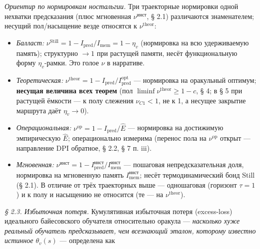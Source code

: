 \documentclass[12pt]{iopart}
\providecommand{\tightlist}{\setlength{\itemsep}{0pt}\setlength{\parskip}{0pt}}
\begin{document}
\emph{Ориентир по нормировкам ностальгии.} Три траекторные нормировки одной нехватки предсказания (плюс мгновенная \(\nu^{\text{инст}}\), § 2.1) различаются знаменателем; несущий пол/насыщение везде относятся к \(\nu^{\text{theor}}\):



\begin{itemize}

\tightlist

\item

  \emph{Балласт:} \(\nu^{\text{Still}} = 1 - I_{\text{pred}}/I_{\text{mem}} = 1 - \eta_v\) (нормировка на всю удерживаемую память); структурно \(\to 1\) при растущей памяти, несёт функциональную форму \(\eta_v\)-рамки. Это голое \(\nu\) в нарративе.

\item

  \emph{Теоретическая:} \(\nu^{\text{theor}} = 1 - I_{\text{pred}}/I_{\text{pred}}^{\text{opt}}\) --- нормировка на оракульный оптимум; \textbf{несущая величина всех теорем} (пол \(\liminf\nu^{\text{theor}} \ge 1-c\), § 4; в § 5 при растущей ёмкости --- к полу слежения \(\nu_{C1} < 1\), не к 1, а несущее закрытие маршрута даёт \(\eta_v \to 0\)).

\item

  \emph{Операциональная:} \(\nu^{\text{op}} = 1 - I_{\text{pred}}/\hat E\) --- нормировка на достижимую эмпирическую \(\hat E\); операционально измерима (перенос пола на \(\nu^{\text{op}}\) открыт --- направление DPI обратное, § 2.2, § 7 п. iii).

\item

  \emph{Мгновенная:} \(\nu^{\text{инст}} = 1 - I_{\text{pred}}^{\text{инст}}/I_{\text{mem}}^{\text{инст}}\) --- пошаговая непредсказательная доля, нормировка на мгновенную память \(I_{\text{mem}}^{\text{инст}}\); несёт термодинамический бонд Still (§ 2.1). В отличие от трёх траекторных выше --- одношаговая (горизонт \(\tau = 1\)) и к полу и насыщению не относится (те --- на \(\nu^{\text{theor}}\)).

\end{itemize}



\emph{§ 2.3. Избыточная потеря.} Кумулятивная избыточная потеря (excess-loss) идеального байесовского обучателя относительно оракула --- \emph{насколько хуже реальный обучатель предсказывает, чем всезнающий эталон, которому известно истинное \(\theta_v(s)\)} --- определена \cite{Andriishin2026b} как
\end{document}
